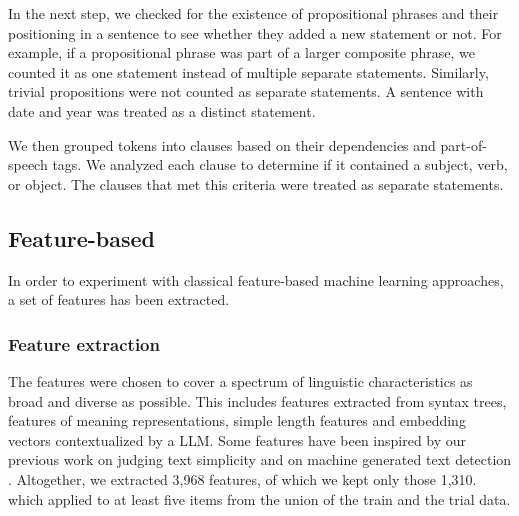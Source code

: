 \documentclass[11pt]{article}
\begin{document}
In the next step, we checked for the existence of propositional phrases and their positioning in a sentence to see whether they added a new statement or not. For example, if a propositional phrase was part of a larger composite phrase, we counted it as one statement instead of multiple separate statements. Similarly, trivial propositions were not counted as separate statements. A sentence with date and year was treated as a distinct statement.

We then grouped tokens into clauses based on their dependencies and part-of-speech tags. We analyzed each clause to determine if it contained a subject, verb, or object. The clauses that met this criteria were treated as separate statements.



\subsection{Feature-based}\label{sec:features}\label{subsec: classification}
In order to experiment with classical feature-based machine learning approaches, a set of features has been extracted. 


\subsubsection{Feature extraction}

The features were chosen to cover a spectrum of linguistic characteristics as broad and diverse as possible. This includes features extracted from syntax trees, features of meaning representations, simple length features and embedding vectors contextualized by a LLM. Some features have been inspired by our previous work on judging text simplicity \citep{arps-etal-2022-hhuplexity} and on machine generated text detection \citep{ciccarelli-etal-2024-team}.
Altogether, we extracted 3,968 features, of which we kept only those 1,310. which applied to at least five items from the union of the train and the trial data. 
\end{document}
